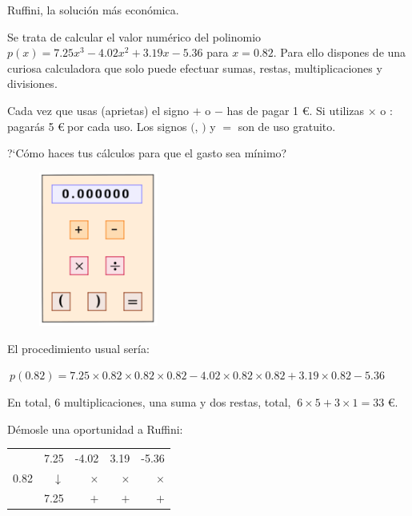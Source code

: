 \begin{myexampleblock}{Ruffini, la solución más económica.}

\begin{multicols}{2}
Se trata de calcular el valor numérico del polinomio $p(x)=7.25x^3-4.02x^2+3.19x-5.36$ para $x=0.82$. Para ello dispones de una curiosa calculadora que solo puede efectuar sumas, restas, multiplicaciones y divisiones. 

\vspace{2mm} Cada vez que usas (aprietas) el signo $\boldsymbol +$ o $\boldsymbol -$ has de pagar 1 \euro. Si utilizas $\boldsymbol \times $ o $\boldsymbol :$ pagarás 5 \euro $\ $por cada uso. Los signos $\boldsymbol ($, $\boldsymbol )$ y $\boldsymbol =$ son de uso gratuito.

\vspace{2mm} ?`Cómo haces tus cálculos para que el gasto sea mínimo?
\begin{figure}[H]
	\centering
	\includegraphics[width=0.35\textwidth]{img-pol/pol01.png}
\end{figure}	
\end{multicols}


El procedimiento usual sería: 

$\ p(0.82)=7.25 \times 0.82 \times 0.82 \times 0.82 - 4.02 \times 0.82 \times 0.82 + 3.19 \times 0.82 - 5.36$	

En total, 6 multiplicaciones, una suma y dos restas, total, $\ 6\times 5+ 3\times 1=33 $ \euro.

\vspace{2mm} Démosle una oportunidad a Ruffini:

\begin{multicols}{2}
\begin{table}[H]
\centering
\begin{tabular}{r|rrrr}
 & 7.25 & -4.02 & 3.19 & -5.36 \\
0.82 & $\downarrow$  & $\boldsymbol{\times}$ & $\boldsymbol{\times}$ & $\boldsymbol{\times}$ \\ \hline
 & 7.25 & $\boldsymbol{+}$ & \multicolumn{1}{r|}{$\boldsymbol{+}$} & $\boldsymbol{+}$ \\ \cline{5-5}
\end{tabular}
\end{table}	


\end{multicols}
\end{myexampleblock}

